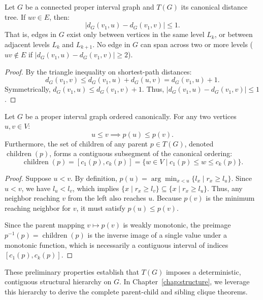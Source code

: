 \begin{lemma}
\label{lem:level_adjacency_restriction}
Let $G$ be a connected proper interval graph and $T(G)$ its canonical distance tree. If $uv \in E$, then:
\begin{equation}
    |d_G(v_1, u) - d_G(v_1, v)| \le 1.
\end{equation}
That is, edges in $G$ exist only between vertices in the same level $L_k$, or between adjacent levels $L_k$ and $L_{k+1}$. No edge in $G$ can span across two or more levels ($uv \notin E$ if $|d_G(v_1, u) - d_G(v_1, v)| \ge 2$).
\end{lemma}
\begin{proof}
By the triangle inequality on shortest-path distances:
\[
    d_G(v_1, v) \le d_G(v_1, u) + d_G(u, v) = d_G(v_1, u) + 1.
\]
Symmetrically, $d_G(v_1, u) \le d_G(v_1, v) + 1$. Thus, $|d_G(v_1, u) - d_G(v_1, v)| \le 1$.
\end{proof}

\begin{lemma}
\label{lem:parent_monotonicity}
Let $G$ be a proper interval graph ordered canonically. For any two vertices $u, v \in V$:
\begin{equation}
    u \le v \implies p(u) \le p(v).
\end{equation}
Furthermore, the set of children of any parent $p \in T(G)$, denoted $\operatorname{children}(p)$, forms a contiguous subsegment of the canonical ordering:
\begin{equation}
    \operatorname{children}(p) = [c_1(p), c_k(p)] = \{ w \in V \mid c_1(p) \le w \le c_k(p) \}.
\end{equation}
\end{lemma}
\begin{proof}
Suppose $u < v$. By definition, $p(u) = \arg\min_{x < u} \{l_x \mid r_x \ge l_u\}$. Since $u < v$, we have $l_u < l_v$, which implies $\{x \mid r_x \ge l_v\} \subseteq \{x \mid r_x \ge l_u\}$. Thus, any neighbor reaching $v$ from the left also reaches $u$. Because $p(v)$ is the minimum reaching neighbor for $v$, it must satisfy $p(u) \le p(v)$. 

Since the parent mapping $v \mapsto p(v)$ is weakly monotonic, the preimage $p^{-1}(p) = \operatorname{children}(p)$ is the inverse image of a single value under a monotonic function, which is necessarily a contiguous interval of indices $[c_1(p), c_k(p)]$.
\end{proof}

These preliminary properties establish that $T(G)$ imposes a deterministic, contiguous structural hierarchy on $G$. In Chapter~\ref{chap:structure}, we leverage this hierarchy to derive the complete parent-child and sibling clique theorems.
